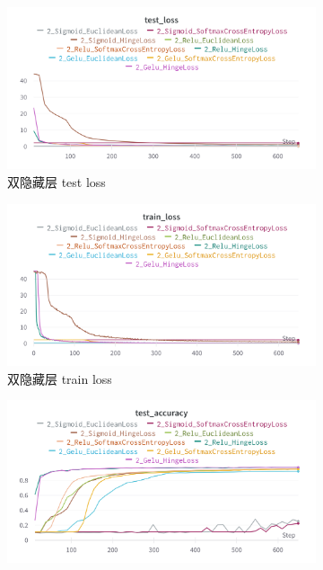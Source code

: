 \documentclass{article}
\begin{document}
\begin{figure}[htbp]
	\centering
	\begin{subfigure}{0.475\textwidth}
		\centering
		\includegraphics[width=1\textwidth]{../pics/双层实验-test_loss.png}
		\caption{双隐藏层 test loss}
	\end{subfigure}
	\begin{subfigure}{0.475\textwidth}
		\centering
		\includegraphics[width=1\textwidth]{../pics/双层实验-train_loss.png}
		\caption{双隐藏层 train loss}
	\end{subfigure}
	\begin{subfigure}{0.475\textwidth}
		\centering
		\includegraphics[width=1\textwidth]{../pics/双层实验-test_acc.png}

\end{subfigure}
\end{figure}
\end{document}
